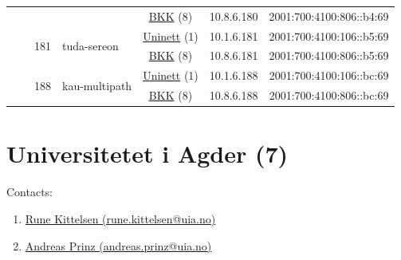 \begin{small}
\begin{center}
\begin{longtable}{|c|c|c|c|c|c|c|c|}
  &  &  &  & \multicolumn{2}{|c|}{\tiny{\href{http://bkk.no}{BKK} (8)}} & \tiny{10.8.6.180} & \tiny{2001:700:4100:806::b4:69} \\* \cline{3-3}\cline{4-4}\cline{5-5}\cline{6-6}\cline{7-7}\cline{8-8}
  &  & \multirow{2}{*}{\tiny{181}} & \multicolumn{1}{|l|}{\multirow{2}{*}{\tiny{tuda-sereon}}} & \multicolumn{2}{|c|}{\tiny{\href{https://www.uninett.no}{Uninett} (1)}} & \tiny{10.1.6.181} & \tiny{2001:700:4100:106::b5:69} \\* \cline{5-5}\cline{6-6}\cline{7-7}\cline{8-8}
  &  &  &  & \multicolumn{2}{|c|}{\tiny{\href{http://bkk.no}{BKK} (8)}} & \tiny{10.8.6.181} & \tiny{2001:700:4100:806::b5:69} \\* \cline{3-3}\cline{4-4}\cline{5-5}\cline{6-6}\cline{7-7}\cline{8-8}
  &  & \multirow{2}{*}{\tiny{188}} & \multicolumn{1}{|l|}{\multirow{2}{*}{\tiny{kau-multipath}}} & \multicolumn{2}{|c|}{\tiny{\href{https://www.uninett.no}{Uninett} (1)}} & \tiny{10.1.6.188} & \tiny{2001:700:4100:106::bc:69} \\* \cline{5-5}\cline{6-6}\cline{7-7}\cline{8-8}
  &  &  &  & \multicolumn{2}{|c|}{\tiny{\href{http://bkk.no}{BKK} (8)}} & \tiny{10.8.6.188} & \tiny{2001:700:4100:806::bc:69} \\ \hline
\end{longtable}
\end{center}
\end{small}



\section{Universitetet i Agder (7)}
\label{sec:UiA}

Contacts:\begin{enumerate}
 \item {}\href{mailto:rune.kittelsen@uia.no}{Rune Kittelsen (rune.kittelsen@uia.no)}
 \item {}\href{mailto:andreas.prinz@uia.no}{Andreas Prinz (andreas.prinz@uia.no)}
\end{enumerate}

